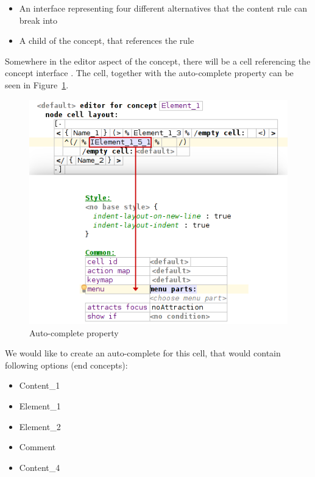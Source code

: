 \begin{itemize}
	\item An interface  representing four different alternatives that the content rule can break into

	\item A child of the  concept, that references the  rule
\end{itemize}

Somewhere in the editor aspect of the  concept, there will be a cell referencing the concept interface .
The cell, together with the auto-complete property can be seen in Figure~\ref{fig:autocomplete_cell}.
\\

\begin{figure}[h]
	\centering
	\includegraphics[scale=0.72]{./img/autocomplete_cell.png}
	\caption{Auto-complete property}
	\label{fig:autocomplete_cell}
\end{figure}

We would like to create an auto-complete for this cell, that would contain following options (end concepts):

\begin{itemize}
	\itemsep0em
	\item Content{\_}1
	\item Element{\_}1
	\item Element{\_}2
	\item Comment
	\item Content{\_}4
\end{itemize}

